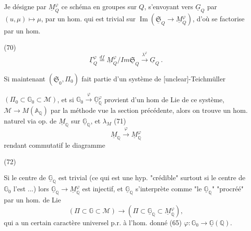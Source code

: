 Je désigne par $\underline{M}_Q^\varphi$ ce schéma en groupes sur $Q$, s'envoyant vers $\underline{G}_Q$ par $(u,\mu) \mapsto \mu$, par un hom. qui est trivial sur $\operatorname{Im}(\underline{\mathfrak{S}}_Q \to \underline{M}_Q^\varphi)$, d'où se factorise par un hom.

(70) $$ \underline{\Gamma}_Q^\varphi \overset{df}{=} \underline{M}_Q^\varphi / Im \underline{\mathfrak{S}}_Q \xrightarrow{\lambda^\varphi} \underline{G}_Q \ . $$

Si maintenant $(\underline{\mathfrak{S}}_0, \Pi_0)$ fait partie d'un système de [unclear]-Teichmüller

\newpage


$(\Pi_0 \subset \mathbb{G}_0 \subset \mathcal{M})$, et si $\mathbb{G}_0 \xrightarrow{\varphi} \underline{\mathbb{G}}^\varphi_\mathbb{Q}$ provient d'un
hom de Lie de ce système, $\mathcal{M} \to M(\mathbb{A}_\mathbb{Q})$
par la méthode vue la section précédente,
alors on trouve un hom. naturel
via op. de $\underline{M}_\mathbb{Q}$ sur $\underline{\mathbb{G}}_\mathbb{Q}$, et $\lambda_M$
(71) $$ \underline{M}_\mathbb{Q} \xrightarrow{\varphi} \underline{M}^\varphi_\mathbb{Q} $$
rendant commutatif le diagramme

(72)

Si le centre de $\underline{\mathbb{G}}_\mathbb{Q}$ est trivial (ce qui est
une hyp. "crédible" surtout si le centre de
$\mathbb{G}_0$ l'est ...) lors $\underline{\mathbb{G}}_\mathbb{Q} \to \underline{M}^\varphi_\mathbb{Q}$ est
injectif, et $\underline{\mathbb{G}}_\mathbb{Q}$ s'interprète comme
"le $\underline{\mathbb{G}}_\mathbb{Q}$" "procréé" par un hom. de
Lie
$$ (\Pi \subset \mathbb{G} \subset \mathcal{M}) \longrightarrow (\Pi \subset \underline{\mathbb{G}}_\mathbb{Q} \subset \underline{M}^\varphi_\mathbb{Q}) , $$
qui a un certain caractère universel
p.r. à l'hom. donné (65) $\varphi : \mathbb{G}_0 \to \underline{\mathbb{G}}(\mathbb{Q})$.


